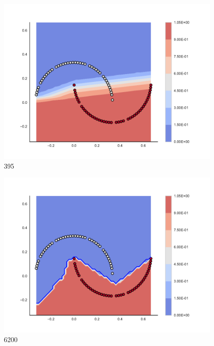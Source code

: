 \begin{subfigure}[b]{0.09\textwidth}
    \includegraphics[width=\textwidth]{img/convergence/395.pdf}
    \caption{395}
    \label{fig:convergence_395}
\end{subfigure}
%
\begin{subfigure}[b]{0.09\textwidth}
    \includegraphics[width=\textwidth]{img/convergence/6200.pdf}
    \caption{6200}
    \label{fig:convergence_6200}
\end{subfigure}
%
